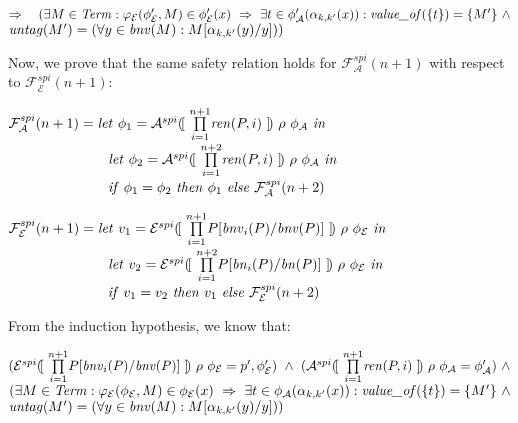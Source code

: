 \documentclass[10pt,a4paper,final,oneside,fleqn]{book}
\begin{document}
\noindent
$\Rightarrow~~~(\exists M\in\mbox{{\itshape Term\/}}:\varphi_\mathcal{E}(\phi'_\mathcal{E},M)\in\phi'_\mathcal{E}(x)~\Rightarrow~\exists t\in\phi'_\mathcal{A}(\alpha_{k,k'}(x)): \mbox{{\itshape value\_of\/}}(\{t\})=\{M'\}~\wedge$\\
$\mbox{{\itshape untag\/}}(M')=(\forall y\in\mbox{{\itshape bnv\/}}(M):M[\alpha_{k,k'}(y)/y]))$\vspace{5mm}


\noindent
Now, we prove that the same safety relation holds for $\mathcal{F}_\mathcal{A}^{spi}(n+1)$ with respect to $\mathcal{F}_\mathcal{E}^{spi}(n+1)$:

\noindent
$\mathcal{F}_\mathcal{A}^{spi}(n+1)=\mbox{{\itshape let\/} }\phi_1=\mathcal{A}^{spi}(\![~\underset{i=1}{\overset{n+1}{\prod}}\mbox{{\itshape ren\/}}(P,i)~]\!)~\rho~\phi_\mathcal{A}\mbox{ {\itshape in\/}}$\\
$\hspace{25mm}\mbox{{\itshape let\/} }\phi_2=\mathcal{A}^{spi}(\![~\underset{i=1}{\overset{n+2}{\prod}}\mbox{{\itshape ren\/}}(P,i)~]\!)~\rho~\phi_\mathcal{A}\mbox{ {\itshape in\/}}$\\
$\hspace{25mm}\mbox{{\itshape if\/} }\phi_1=\phi_2\mbox{ {\itshape then\/} }\phi_1\mbox{ {\itshape else\/} }\mathcal{F}_\mathcal{A}^{spi}(n+2)$\vspace{5mm}

\noindent
$\mathcal{F}_\mathcal{E}^{spi}(n+1)=\mbox{{\itshape let\/} }v_1=\mathcal{E}^{spi}(\![~\underset{i=1}{\overset{n+1}{\prod}}P[\mbox{{\itshape bnv\/}}_i(P)/\mbox{{\itshape bnv\/}}(P)]~]\!)~\rho~\phi_\mathcal{E}\mbox{ {\itshape in\/}}$\\
$\hspace{25mm}\mbox{{\itshape let\/} }v_2=\mathcal{E}^{spi}(\![~\underset{i=1}{\overset{n+2}{\prod}}P[\mbox{{\itshape bn\/}}_i(P)/\mbox{{\itshape bn\/}}(P)]~]\!)~\rho~\phi_\mathcal{E}\mbox{ {\itshape in\/}}$\\
$\hspace{25mm}\mbox{{\itshape if\/} }v_1=v_2\mbox{ {\itshape then\/} }v_1\mbox{ {\itshape else\/} }\mathcal{F}_\mathcal{E}^{spi}(n+2)$\vspace{5mm}

\noindent
From the induction hypothesis, we know that:

\noindent
$(\mathcal{E}^{spi}(\![~\underset{i=1}{\overset{n+1}{\prod}}P[\mbox{{\itshape bnv\/}}_i(P)/\mbox{{\itshape bnv\/}}(P)]~]\!)~\rho~\phi_\mathcal{E}=p',\phi'_\mathcal{E})~\wedge~(\mathcal{A}^{spi}(\![~\underset{i=1}{\overset{n+1}{\prod}}\mbox{{\itshape ren\/}}(P,i)~]\!)~\rho~\phi_\mathcal{A}=\phi'_\mathcal{A})~\wedge$\\
$(\exists M\in\mbox{{\itshape Term\/}}:\varphi_\mathcal{E}(\phi_\mathcal{E},M)\in\phi_\mathcal{E}(x)~\Rightarrow~\exists t\in\phi_\mathcal{A}(\alpha_{k,k'}(x)):\mbox{{\itshape value\_of\/}}(\{t\})=\{M'\}~\wedge$\\
$\mbox{{\itshape untag\/}}(M')=(\forall y\in\mbox{{\itshape bnv\/}}(M):M[\alpha_{k,k'}(y)/y]))$\vspace{5mm}
\end{document}
